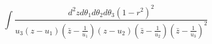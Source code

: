 \begin{equation}
\int\frac{d^2 zd\theta_1 d\theta_2
d\theta_3(1-r^2)^2}{u_3(z-u_1)(\bar z-\frac{1}{u_1})(z-u_2)(\bar
z-\frac{1}{u_2})(\bar z-\frac{1}{u_3})^2}
\end{equation}

